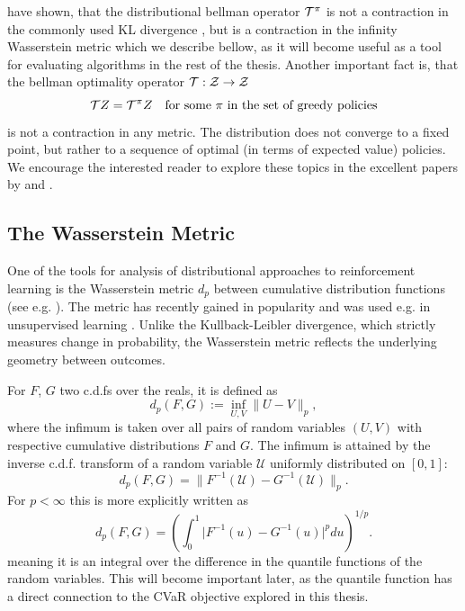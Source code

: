 \citet{bellemare2017distributional} have shown, that the distributional bellman operator $\mathcal{T}^\pi$ is not a contraction in the commonly used KL divergence \cite{kullback1997information}, but is a contraction in the infinity Wasserstein metric which we describe bellow, as it will become useful as a tool for evaluating algorithms in the rest of the thesis. Another important fact is, that the bellman optimality operator $\mathcal{T} : \mathcal{Z}\to\mathcal{Z}$
\begin{equation}
\mathcal{T} Z = \mathcal{T}^\pi Z \quad \text{for some } \pi \text{ in the set of greedy policies}
\end{equation}
is not a contraction in any metric. The distribution does not converge to a fixed point, but rather to a sequence of optimal (in terms of expected value) policies. We encourage the interested reader to explore these topics in the excellent papers by \citet{bellemare2017distributional} and \citet{dabney2017distributional}.

\subsection{The Wasserstein Metric}
\newcommand{\pnorm}[1]{\| #1 \|_p}

One of the tools for analysis of distributional approaches to reinforcement learning is the Wasserstein metric $d_p$ between cumulative distribution functions (see e.g. \citet{bickel1981some}). The metric has recently gained in popularity and was used e.g. in unsupervised learning \citep{arjovsky2017wasserstein,bellemare2017cramer}. Unlike the Kullback-Leibler divergence, which strictly measures change in probability, the Wasserstein metric reflects the underlying geometry between outcomes.

For $F$, $G$ two c.d.fs over the reals, it is defined as
\begin{equation*}
d_p(F, G) := \inf_{U, V} \pnorm{U - V},
\end{equation*}
where the infimum is taken over all pairs of random variables $(U, V)$ with respective cumulative distributions $F$ and $G$. The infimum is attained by the inverse c.d.f. transform of a random variable $\mathcal{U}$ uniformly distributed on $[0, 1]$:
\begin{equation*}
d_p(F, G) = \| F^{-1}(\mathcal{U}) - G^{-1}(\mathcal{U}) \|_p .
\end{equation*}
For $p < \infty$ this is more explicitly written as
\begin{equation}
d_p(F, G) = \left ( \int_0^1 \big | F^{-1}(u) - G^{-1}(u) \big |^p du \right )^{1/p} .
\end{equation}
meaning it is an integral over the difference in the quantile functions of the random variables. This will become important later, as the quantile function has a direct connection to the CVaR objective  explored in this thesis.


